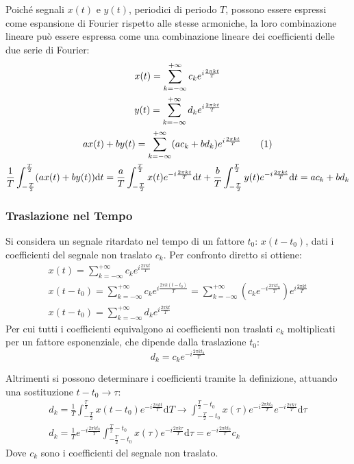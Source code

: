 \documentclass{article}
\newcommand{\df}{\mathrm{d}}
\newcommand{\tageq}{\tag{\stepcounter{equation}\theequation}}
\numberwithin{equation}{subsection}
\begin{document}
Poiché segnali $x(t)$ e $y(t)$, periodici di periodo $T$, possono essere espressi come espansione di Fourier rispetto alle stesse armoniche, la loro combinazione lineare 
può essere espressa come una combinazione lineare dei coefficienti delle due serie di Fourier:
\begin{gather*}
    x(t)=\displaystyle\sum_{k=-\infty}^{+\infty}c_ke^{i\frac{2\pi  k t}{T}}\\    
    y(t)=\displaystyle\sum_{k=-\infty}^{+\infty}d_ke^{i\frac{2\pi  k t}{T}}\\
    ax(t)+by(t)=\displaystyle\sum_{k=-\infty}^{+\infty}(ac_k+bd_k)e^{i\frac{2\pi  k t}{T}}\tageq\\
    \displaystyle\frac{1}{T}\int_{-\frac{T}{2}}^{\frac{T}{2}}(ax(t)+by(t))\df t=\frac{a}{T}\int_{-\frac{T}{2}}^{\frac{T}{2}}x(t)e^{-i\frac{2\pi  k t}{T}}\df t
    +\frac{b}{T}\int_{-\frac{T}{2}}^{\frac{T}{2}}y(t)e^{-i\frac{2\pi  k t}{T}}\df t=ac_k+bd_k
\end{gather*}

\subsubsection{Traslazione nel Tempo}

Si considera un segnale ritardato nel tempo di un fattore $t_0$: $x(t-t_0)$, dati i coefficienti del segnale non traslato $c_k$. Per confronto diretto si ottiene:
\begin{gather*}
    x(t)=\displaystyle\sum_{k=-\infty}^{+\infty}c_ke^{i\frac{2\pi kt}{T}}\\
    x(t-t_0)=\displaystyle\sum_{k=-\infty}^{+\infty}c_ke^{i\frac{2\pi k(t-t_0)}{T}}=\sum_{k=-\infty}^{+\infty}\left(c_ke^{-i\frac{2\pi kt_0}{T}}\right)e^{i\frac{2\pi kt}{T}}\\
    x(t-t_0)=\displaystyle\sum_{k=-\infty}^{+\infty}d_ke^{i\frac{2\pi kt}{T}}
\end{gather*}
Per cui tutti i coefficienti equivalgono ai coefficienti non traslati $c_k$ moltiplicati per un fattore esponenziale, che dipende dalla traslazione $t_0$:
\begin{equation}
    \displaystyle d_k=c_ke^{-i\frac{2\pi kt_0}{T}}
\end{equation}

Altrimenti si possono determinare i coefficienti tramite la definizione, attuando una sostituzione $t-t_0\to\tau$:
\begin{gather*}
    d_k=\displaystyle\frac{1}{T}\int_{-\frac{T}{2}}^{\frac{T}{2}}x(t-t_0)e^{-i\frac{2\pi kt}{T}}\df T\to\int_{-\frac{T}{2}-t_0}^{\frac{T}{2}-t_0}x(\tau)e^{-i\frac{2\pi kt_0}{T}}e^{-i\frac{2\pi k\tau}{T}}\df\tau\\
    d_k=\displaystyle\frac{1}{T}e^{-i\frac{2\pi kt_0}{T}}\int_{-\frac{T}{2}-t_0}^{\frac{T}{2}-t_0}x(\tau)e^{-i\frac{2\pi k\tau}{T}}\df\tau=e^{-i\frac{2\pi kt_0}{T}}c_k
\end{gather*}
Dove $c_k$ sono i coefficienti del segnale non traslato. 
\end{document}
